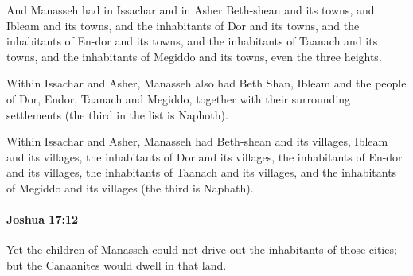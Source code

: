 			\begin{versebox}
					\item[BHS] 
					\item[ASV] And Manasseh had in Issachar and in Asher Beth-shean and its towns, and Ibleam and its towns, and the inhabitants of Dor and its towns, and the inhabitants of En-dor and its towns, and the inhabitants of Taanach and its towns, and the inhabitants of Megiddo and its towns, even the three heights.
					\item[NIV] Within Issachar and Asher, Manasseh also had Beth Shan, Ibleam and the people of Dor, Endor, Taanach and Megiddo, together with their surrounding settlements (the third in the list is Naphoth).
					\item[NRSV] Within Issachar and Asher, Manasseh had Beth-shean and its villages, Ibleam and its villages, the inhabitants of Dor and its villages, the inhabitants of En-dor and its villages, the inhabitants of Taanach and its villages, and the inhabitants of Megiddo and its villages (the third is Naphath).
			\end{versebox}

		\paragraph{Joshua 17:12} %
			\label{JOSHUA-17-12}

			Yet the children of Manasseh could not drive out the inhabitants of those cities; but the Canaanites would dwell in that land.

